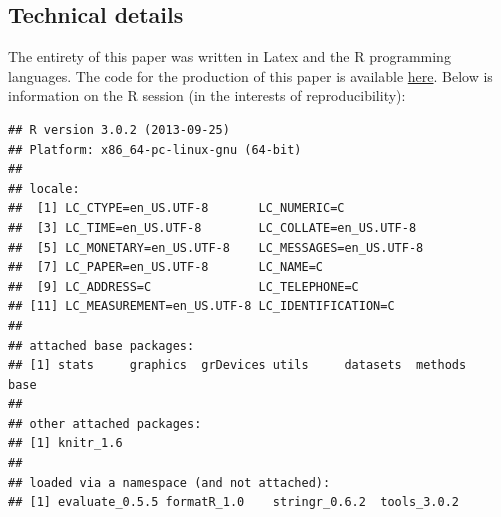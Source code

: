 \subsection*{Technical details} The entirety of this paper was written in Latex and the R programming languages.  The code for the production of this paper is available \href{https://github.com/joebrew/uf}{here}.  Below is information on the R session (in the interests of reproducibility):
\begin{knitrout}
\color{fgcolor}\begin{kframe}
\begin{verbatim}
## R version 3.0.2 (2013-09-25)
## Platform: x86_64-pc-linux-gnu (64-bit)
## 
## locale:
##  [1] LC_CTYPE=en_US.UTF-8       LC_NUMERIC=C              
##  [3] LC_TIME=en_US.UTF-8        LC_COLLATE=en_US.UTF-8    
##  [5] LC_MONETARY=en_US.UTF-8    LC_MESSAGES=en_US.UTF-8   
##  [7] LC_PAPER=en_US.UTF-8       LC_NAME=C                 
##  [9] LC_ADDRESS=C               LC_TELEPHONE=C            
## [11] LC_MEASUREMENT=en_US.UTF-8 LC_IDENTIFICATION=C       
## 
## attached base packages:
## [1] stats     graphics  grDevices utils     datasets  methods   base     
## 
## other attached packages:
## [1] knitr_1.6
## 
## loaded via a namespace (and not attached):
## [1] evaluate_0.5.5 formatR_1.0    stringr_0.6.2  tools_3.0.2
\end{verbatim}
\end{kframe}
\end{knitrout}


